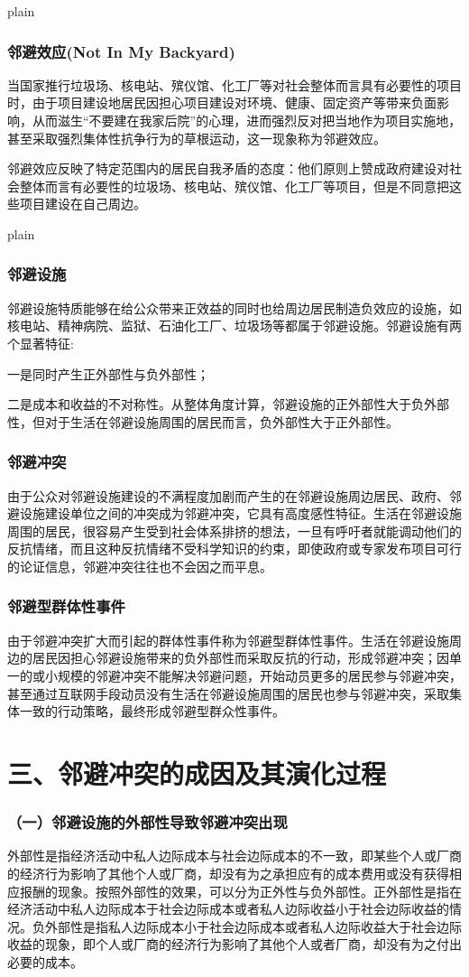 \documentclass[aspectratio=169, 12pt]{beamer}
\begin{document}
\begin{frame}{plain}
    \frametitle{邻避效应(Not In My Backyard)}
    当国家推行垃圾场、核电站、殡仪馆、化工厂等对社会整体而言具有必要性的项目时，由于项目建设地居民因担心项目建设对环境、健康、固定资产等带来负面影响，从而滋生“不要建在我家后院”的心理，进而强烈反对把当地作为项目实施地，甚至采取强烈集体性抗争行为的草根运动，这一现象称为邻避效应。
    \par
    邻避效应反映了特定范围内的居民自我矛盾的态度：他们原则上赞成政府建设对社会整体而言有必要性的垃圾场、核电站、殡仪馆、化工厂等项目，但是不同意把这些项目建设在自己周边。
\end{frame}

\begin{frame}{plain}
    \frametitle{邻避设施}
    邻避设施特质能够在给公众带来正效益的同时也给周边居民制造负效应的设施，如核电站、精神病院、监狱、石油化工厂、垃圾场等都属于邻避设施。邻避设施有两个显著特征:
    \par
    一是同时产生正外部性与负外部性；
    \par
    二是成本和收益的不对称性。从整体角度计算，邻避设施的正外部性大于负外部性，但对于生活在邻避设施周围的居民而言，负外部性大于正外部性。
\end{frame}

\begin{frame}[plain]
    \frametitle{邻避冲突}
    由于公众对邻避设施建设的不满程度加剧而产生的在邻避设施周边居民、政府、邻避设施建设单位之间的冲突成为邻避冲突，它具有高度感性特征。生活在邻避设施周围的居民，很容易产生受到社会体系排挤的想法，一旦有呼吁者就能调动他们的反抗情绪，而且这种反抗情绪不受科学知识的约束，即使政府或专家发布项目可行的论证信息，邻避冲突往往也不会因之而平息。
\end{frame}

\begin{frame}[plain]
    \frametitle{邻避型群体性事件}
    由于邻避冲突扩大而引起的群体性事件称为邻避型群体性事件。生活在邻避设施周边的居民因担心邻避设施带来的负外部性而采取反抗的行动，形成邻避冲突；因单一的或小规模的邻避冲突不能解决邻避问题，开始动员更多的居民参与邻避冲突，甚至通过互联网手段动员没有生活在邻避设施周围的居民也参与邻避冲突，采取集体一致的行动策略，最终形成邻避型群众性事件。
\end{frame}

\section{三、邻避冲突的成因及其演化过程}

\begin{frame}[plain]
    \frametitle{（一）邻避设施的外部性导致邻避冲突出现}
    外部性是指经济活动中私人边际成本与社会边际成本的不一致，即某些个人或厂商的经济行为影响了其他个人或厂商，却没有为之承担应有的成本费用或没有获得相应报酬的现象。按照外部性的效果，可以分为正外性与负外部性。正外部性是指在经济活动中私人边际成本于社会边际成本或者私人边际收益小于社会边际收益的情况。负外部性是指私人边际成本小于社会边际成本或者私人边际收益大于社会边际收益的现象，即个人或厂商的经济行为影响了其他个人或者厂商，却没有为之付出必要的成本。
\end{frame}
\end{document}
